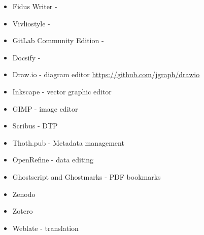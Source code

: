 \documentclass{article}
\begin{document}
\begin{itemize}
\item Fidus Writer - 


\item Vivliostyle - 


\item GitLab Community Edition - 


\item Docsify - 


\item Draw.io - diagram editor \href{https://github.com/jgraph/drawio}{https://github.com/jgraph/drawio}


\item Inkscape - vector graphic editor


\item GIMP - image editor


\item Scribus - DTP


\item Thoth.pub - Metadata management 


\item OpenRefine - data editing


\item Ghostscript and Ghostmarks - PDF bookmarks 


\item Zenodo


\item Zotero


\item Weblate - translation


\end{itemize}
\end{document}
